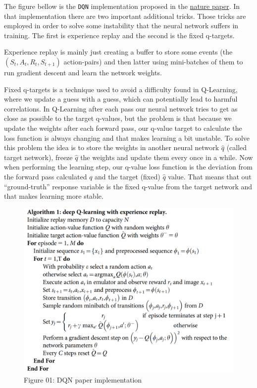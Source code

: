 \documentclass[
]{article}
\begin{document}
The figure bellow is the \texttt{DQN} implementation proposed in the
\href{https://storage.googleapis.com/deepmind-media/dqn/DQNNaturePaper.pdf}{nature
paper}. In that implementation there are two important additional
tricks. Those tricks are employed in order to solve some instability
that the neural network suffers in training. The first is experience
replay and the second is the fixed q-targets.

Experience replay is mainly just creating a buffer to store some events
(the \((S_{t},A_{t},R_{t},S_{t+1})\) action-pairs) and then latter using
mini-batches of them to run gradient descent and learn the network
weights.

Fixed q-targets is a technique used to avoid a difficulty found in
Q-Learning, where we update a guess with a guess, which can potentially
lead to harmful correlations. In Q-Learning after each pass our neural
network tries to get as close as possible to the target q-values, but
the problem is that because we update the weights after each forward
pass, our q-value target to calculate the loss function is always
changing and that makes learning a bit unstable. To solve this problem
the idea is to store the weights in another neural network \(\hat{q}\)
(called target network), freeze \(\hat{q}\) the weights and update them
every once in a while. Now when performing the learning step, our
q-value loss function is the deviation from the forward pass calculated
\(q\) and the target (fixed) \(\hat{q}\) value. That means that out
``ground-truth'' response variable is the fixed q-value from the target
network and that makes learning more stable.

\begin{figure}
\centering
\includegraphics{imgs/dqn_print_1.png}
\caption{Figure 01: DQN paper implementation}
\end{figure}
\end{document}
